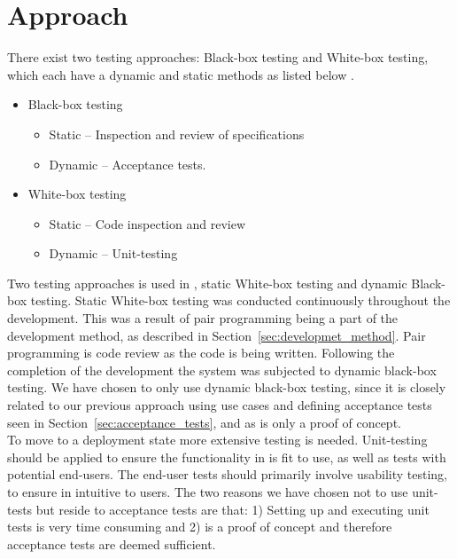 \section{Approach}
\label{sec:testing_approach}
There exist two testing approaches: Black-box testing and White-box testing, which each have a dynamic and static methods as listed below \citep{Patton06}.

\begin{itemize}
	\item Black-box testing
		\begin{itemize}
			\item Static -- Inspection and review of specifications
			\item Dynamic -- Acceptance tests.
		\end{itemize}

	\item White-box testing
		\begin{itemize}
			\item Static -- Code inspection and review
			\item Dynamic -- Unit-testing
		\end{itemize}
\end{itemize}

Two testing approaches is used in \projectname{}, static White-box testing and dynamic Black-box testing.
Static White-box testing was conducted continuously throughout the development.
This was a result of pair programming being a part of the development method, as described in Section~\ref{sec:developmet_method}.
Pair programming is code review as the code is being written\citep{Patton06}.
Following the completion of the development the system was subjected to dynamic black-box testing.
We have chosen to only use dynamic black-box testing, since it is closely related to our previous approach using use cases and defining acceptance tests seen in Section~\ref{sec:acceptance_tests}, and as \projectname{} is only a proof of concept.\\

To move \projectname{} to a deployment state more extensive testing is needed.
Unit-testing should be applied to ensure the functionality in \projectname{} is fit to use, as well as tests with potential end-users.
The end-user tests should primarily involve usability testing, to ensure \projectname{} in intuitive to users.
The two reasons we have chosen not to use unit-tests but reside to acceptance tests are that: 1) Setting up and executing unit tests is very time consuming and 2) \projectname{} is a proof of concept and therefore acceptance tests are deemed sufficient.\\

